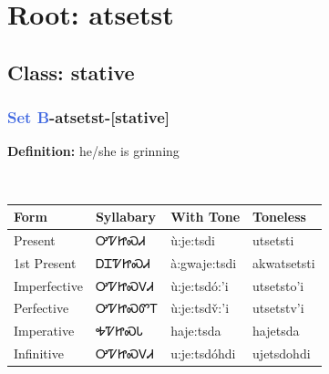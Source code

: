 \needspace{4in}
\section*{Root: atsetst}
\nopagebreak
{}
\needspace{3in}
\subsection*{Class: stative}
\nopagebreak
\needspace{2in}
\subsubsection*{\textcolor{RoyalBlue}{Set B}{-}\textbf{atsetst}{-}[stative]}
\nopagebreak
\textbf{Definition: } he/she is grinning
\\[0.5em]
\begin{tabularx}{\textwidth}{l X X X}%
\toprule%
\textbf{Form}&\textbf{Syllabary}&\textbf{With Tone}&\textbf{Toneless}\\%
\midrule%
Present&ᎤᏤᏥᏍᏗ&ù:je:tsdi&utsetsti\\%
1st Present&ᎠᏆᏤᏥᏍᏗ&à:gwaje:tsdi&akwatsetsti\\%
Imperfective&ᎤᏤᏥᏍᏙᏗ&ù:je:tsdó:’i&utsetsto'i\\%
Perfective&ᎤᏤᏥᏍᏛᎢ&ù:je:tsdv̌:’i&utsetstv'i\\%
Imperative&ᎭᏤᏥᏍᏓ&haje:tsda&hajetsda\\%
Infinitive&ᎤᏤᏥᏍᏙᏗ&u:je:tsdóhdi&ujetsdohdi\\%
\bottomrule%
\end{tabularx}
\\[1em]